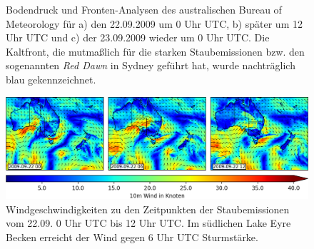 \documentclass[12pt,a4paper,onecolumn]{scrartcl}
\begin{document}
\begin{figure}
\begin{minipage}[c]{0.33\textwidth}
	\end{minipage}\hfill
	\caption{Bodendruck und Fronten-Analysen des australischen Bureau of Meteorology für a) den 22.09.2009 um 0 Uhr UTC, b) später um 12 Uhr UTC und c) der 23.09.2009 wieder um 0 Uhr UTC. Die Kaltfront, die mutmaßlich für die starken Staubemissionen bzw. den sogenannten \textit{Red Dawn} in Sydney geführt hat, wurde nachträglich blau gekennzeichnet.} \label{fig:bom_analysis}
\end{figure}
\begin{figure}
\includegraphics[width=\textwidth]{bilder/reddawn/wind_reddawn_small.png}
\caption{Windgeschwindigkeiten zu den Zeitpunkten der Staubemissionen vom 22.09. 0 Uhr UTC bis 12 Uhr UTC. Im südlichen Lake Eyre Becken erreicht der Wind gegen 6 Uhr UTC Sturmstärke.} \label{fig:wind_reddawn}
\end{figure}
\end{document}
